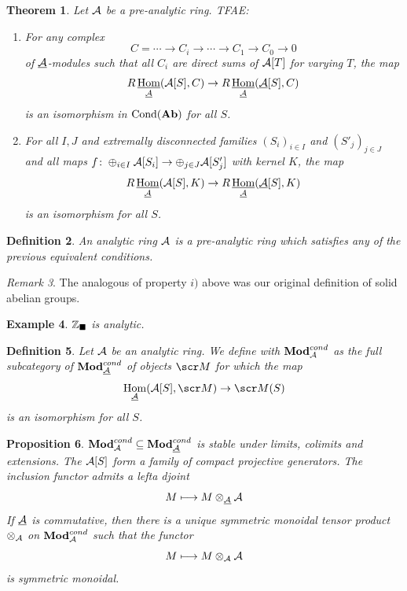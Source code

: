 \documentclass[A4paper, british, reqno]{amsart}
\theoremstyle{darkgreentheorem}
\newtheorem{thm}{Theorem}[section]
\newtheorem{prop}[thm]{Proposition}
\theoremstyle{darkbluedefinition}
\newtheorem{defn}[thm]{Definition}
\theoremstyle{darkredexample}
\newtheorem{exa}[thm]{Example}
\theoremstyle{remark}
\newtheorem{rem}[thm]{Remark}
\DeclareMathOperator{\Hom}{Hom}
\DeclareMathOperator{\Cond}{Cond}
\DeclareMathOperator{\ihom}{\underline{Hom}}
\newcommand{\1}{\mathbbm{1}}
\renewcommand{\u}[1]{\underline{#1}}
\newcommand{\ot}{\otimes}
\newcommand{\op}{\oplus}
\newcommand{\sub}{\subseteq}
\newcommand{\usolid}{_{\blacksquare}}
\begin{document}
\begin{thm}
    Let $\mathcal{A}$ be a pre-analytic ring.
    TFAE:
    \begin{enumerate}[label=\roman*)]
	\item For any complex
	    \[ C=\cdots \to C_{i}\to \cdots\to C_{1}\to C_{0}\to 0 \]
	    of $\u{\calA}$-modules such that all $C_{i}$ are direct sums of $\mathcal{A}[T]$ for varying $T$, the map
	    \[ R\ihom_{\u{\calA}}(\calA[S],C)\to R\ihom_{\u{\calA}}(\u{\calA}[S],C) \]
	    is an isomorphism in $\Cond(\Ab)$ for all $S$.
	\item For all $I,J$ and extremally disconnected families $(S_{i})_{i\in I}$ and $(S'_{j})_{j\in J}$ and all maps $f\colon \op_{i\in I}\calA[S_{i}]\to \op_{j\in J}\calA[S'_{j}]$ with kernel $K$, the map
	    \[ R\ihom_{\u{\calA}}(\calA[S],K)\to R\ihom_{\u{\calA}}(\u{\calA}[S],K) \]
	    is an isomorphism for all $S$.
    \end{enumerate}
\end{thm}

\begin{defn}
    An \textit{analytic ring} $\mathcal{A}$ is a pre-analytic ring which satisfies any of the previous equivalent conditions.
\end{defn}

\begin{rem}
    The analogous of property $i)$ above was our original definition of solid abelian groups.
\end{rem}

\begin{exa}
    $\Z\usolid$ is analytic.
\end{exa}

\begin{defn}
    Let $\mathcal{A}$ be an analytic ring.
    We define with $\mathbf{Mod}_{\mathcal{A}}^{cond}$ as the full subcategory of $\Mod_{\u{\calA}}^{cond}$ of objects $\M$ for which the map
    \[ \Hom_{\u{\calA}}(\calA[S],\M)\to \M(S) \]
    is an isomorphism for all $S$.
\end{defn}

\begin{prop}
    $\Mod_{\calA}^{cond}\sub \Mod_{\u{\calA}}^{cond}$ is stable under limits, colimits and extensions.
    The $\mathcal{A}[S]$ form a family of compact projective generators.
    The inclusion functor admits a lefta djoint
    \[ M\longmapsto M\ot_{\u{\calA}}\calA \]
    If $\u{\calA}$ is commutative, then there is a unique symmetric monoidal tensor product $\ot_{\calA}$ on $\mathbf{Mod}_{\mathcal{A}}^{cond}$ such that the functor
    \[ M\longmapsto M\ot_{\calA}\calA \]
    is symmetric monoidal.
\end{prop}
\end{document}
